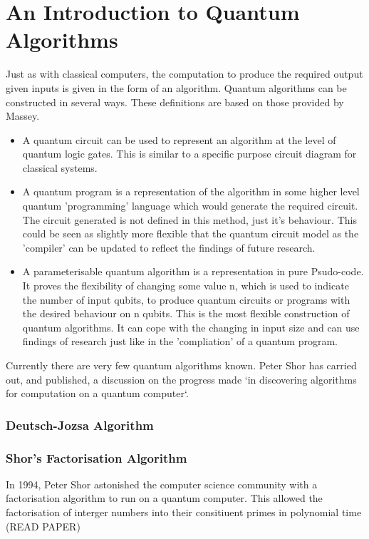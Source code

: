 \documentclass[authoryearcitations]{UoYCSproject}
\begin{document}
\section{An Introduction to Quantum Algorithms}

Just as with classical computers, the computation to produce the required output given inputs is given in the form of an algorithm.
Quantum algorithms can be constructed in several ways. These definitions are based on those provided by Massey\cite{masseythesis}.

\begin{itemize}
\item A quantum circuit can be used to represent an algorithm at the level of quantum logic gates.
This is similar to a specific purpose circuit diagram for classical systems.
\item A quantum program is a representation of the algorithm in some higher level quantum 'programming' language which would generate the required circuit.
The circuit generated is not defined in this method, just it's behaviour.
This could be seen as slightly more flexible that the quantum circuit model as the 'compiler' can be updated to reflect the findings of future research.
\item A parameterisable quantum algorithm is a representation in pure Psudo-code.
It proves the flexibility of changing some value n, which is used to indicate the number of input qubits, to produce quantum circuits or programs with the desired behaviour on n qubits.
This is the most flexible construction of quantum algorithms.
It can cope with the changing in input size and can use findings of research just like in the 'compliation' of a quantum program.
\end{itemize}

Currently there are very few quantum algorithms known.
Peter Shor has carried out, and published, a discussion on the progress made `in discovering algorithms for computation on a quantum computer`\cite{Shor:2004:PQA:1032132.1032149}.

\subsubsection{Deutsch-Jozsa Algorithm}

\subsubsection{Shor's Factorisation Algorithm}
In 1994, Peter Shor astonished the computer science community with a factorisation algorithm to run on a quantum computer.
This allowed the factorisation of interger numbers into their consitiuent primes in polynomial time
(READ PAPER) 
\end{document}
